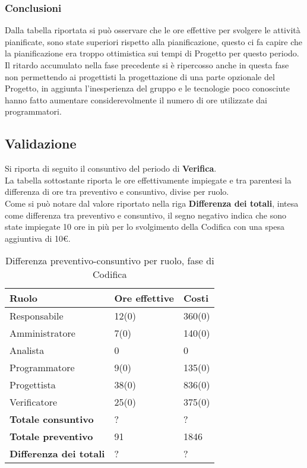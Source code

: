 \subsubsection{Conclusioni}

Dalla tabella riportata si può osservare che le ore effettive per svolgere le attività pianificate, sono state superiori rispetto alla pianificazione, questo ci fa capire che la pianificazione era troppo ottimistica sui tempi di Progetto per questo periodo.
Il ritardo accumulato nella fase precedente si è ripercosso anche in questa fase non permettendo ai progettisti la progettazione di una parte opzionale del Progetto, in aggiunta l'inesperienza del gruppo e le tecnologie poco conosciute hanno fatto aumentare considerevolmente il numero di ore utilizzate dai programmatori.



\subsection{Validazione}

Si riporta di seguito il consuntivo del periodo di \textbf{Verifica}.\\
La tabella sottostante riporta le ore effettivamente impiegate e tra parentesi la differenza di ore tra preventivo e consuntivo, divise per ruolo.\\ Come si può notare dal valore riportato nella riga \textbf{Differenza dei totali}, intesa come differenza tra preventivo e consuntivo, il segno negativo indica che sono state impiegate 10 ore in più per lo svolgimento della Codifica con una spesa aggiuntiva di 10\euro.

	\begin{table}[H]
		\centering
	  \begin{tabular}{p{}p{}
		    							p{}}
		   \toprule Ruolo & Ore effettive & Costi \\
		   \midrule
		   Responsabile & 12(0) & 360(0) \\
		   Amministratore & 7(0) & 140(0) \\
		   Analista & 0 & 0 \\
		   Programmatore & 9(0) & 135(0) \\
		   Progettista & 38(0) & 836(0) \\
		   Verificatore & 25(0) & 375(0) \\
		   \hline
		   \textbf{Totale consuntivo} & ? & ? \\
		   \textbf{Totale preventivo} & 91 & 1846 \\
		   \textbf{Differenza dei totali} & ? & ? \\
		   \bottomrule
	 \end{tabular}
	 	\label{tab:costuntivoCodifica}
	 	\caption{Differenza preventivo-consuntivo per ruolo, fase di Codifica}
	\end{table}

